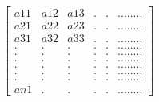 \documentclass[preview]{standalone}
\begin{document}
\begin{align*}
\begin{bmatrix} {a}{11} & {a}{12} & {a}{13} & . & . & ........\\ {a}{21} & {a}{22} & {a}{23} & . & . & ........ \\ {a}{31} & {a}{32} & {a}{33} & . & . & ........    
            \\ . & . & . & . & . & ........\\ . & . & . & . & . & ........\\ . & . & . & . & . & ........\\ . & . & . & . & . & ........
            \\ . & . & . & . & . & ........\\ . & . & . & . & . & ........\\ {a}{n1}   & . & . & . & . & ........\end{bmatrix}
\end{align*}
\end{document}
